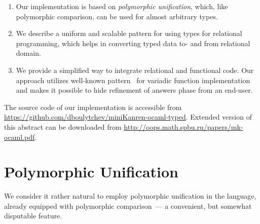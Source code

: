 \documentclass[10pt, oneside, nocopyrightspace]{sigplanconf}
\begin{document}
\begin{enumerate}
\item Our implementation is based on \emph{polymorphic unification}, which, like polymorphic comparison,
can be used for almost arbitrary types. 

\begin{comment}
The implementation of polymorphic unification uses unsafe features and
relies on intrinsic knowledge of runtime representation of values; we show, however, that this does not
compromise type safety. Practically, we applied purely \emph{ad hoc} approach since the features, 
which would provide less \emph{ad hoc} solution are not yet integrated into the mainstream language.
\end{comment}

\item We describe a uniform and scalable pattern for using types for relational programming, which
helps in converting typed data to- and from relational domain. 

\begin{comment}
With this pattern, only one
generic feature (``\lstinline{map/morphism/Functor}'') is needed, and thus virtually any generic 
framework for OCaml can be used. Despite being rather a pragmatic observation, this pattern, as we
believe, would lead to a more regular and easy to maintain relational specifications.
\end{comment}

\item We provide a simplified way to integrate relational and functional code. Our approach utilizes
well-known pattern~\cite{Unparsing, DoWeNeed} for variadic function implementation and makes it
possible to hide refinement of answers phase from an end-user.
\end{enumerate}

The source code of our implementation is accessible from \url{https://github.com/dboulytchev/miniKanren-ocaml-typed}.
Extended version of this abstract can be downloaded from \url{http://oops.math.spbu.ru/papers/mk-ocaml.pdf}.

\section{Polymorphic Unification}
\label{polyuni}

We consider it rather natural to employ polymorphic unification in the
language, already equipped with polymorphic comparison~--- a convenient, but
somewhat disputable
feature. 
\end{document}

